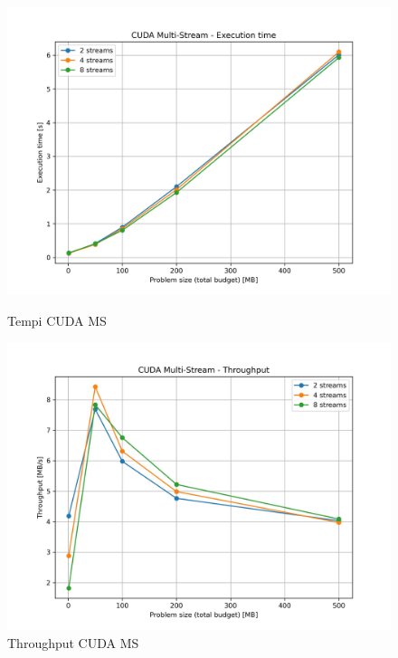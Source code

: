 			\begin{figure}[H]
				\centering
				\begin{minipage}[t]{0.49\textwidth}
					\centering
					\includegraphics[width=\textwidth]{img/cuda_ms_plots/cuda_ms_times.jpg}
					\caption{Tempi CUDA MS}
					\label{fig:cuda_ms_times}
				\end{minipage}
				\hfill
				\begin{minipage}[t]{0.49\textwidth}
					\centering
					\includegraphics[width=\textwidth]{img/cuda_ms_plots/cuda_ms_throughput.jpg}
					\caption{Throughput CUDA MS}
					\label{fig:cuda_ms_throughput}
				\end{minipage}
			\end{figure}
			
